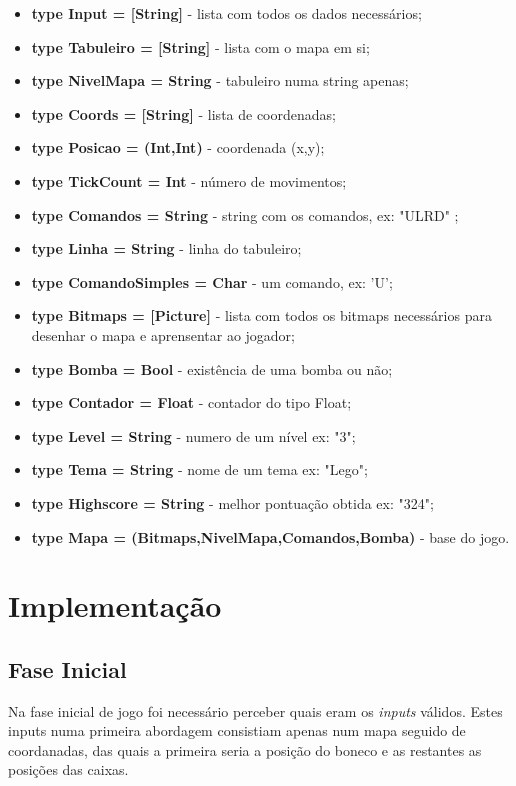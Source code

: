 \documentclass[12pt,a4paper]{report}
\begin{document}
\begin{itemize}
  \item \textbf{type Input          = [String]}   - lista com todos os dados necessários;    
  \item \textbf{type Tabuleiro      = [String]}   - lista com o mapa em si;
  \item \textbf{type NivelMapa      = String}     - tabuleiro numa string apenas;
  \item \textbf{type Coords         = [String]}   - lista de coordenadas;
  \item \textbf{type Posicao        = (Int,Int)}  - coordenada (x,y);
  \item \textbf{type TickCount      = Int}        - número de movimentos;
  \item \textbf{type Comandos       = String}     - string com os comandos, ex: "ULRD" ;
  \item \textbf{type Linha          = String}     - linha do tabuleiro;
  \item \textbf{type ComandoSimples = Char}       - um comando, ex: 'U';
  \item \textbf{type Bitmaps        = [Picture]}  - lista com todos os bitmaps necessários para desenhar o mapa e aprensentar ao jogador;
  \item \textbf{type Bomba          = Bool}       - existência de uma bomba ou não;
  \item \textbf{type Contador       = Float}      - contador do tipo Float;
  \item \textbf{type Level          = String}     - numero de um nível ex: "3";
  \item \textbf{type Tema           = String}     - nome de um tema ex: "Lego";
  \item \textbf{type Highscore      = String}     - melhor pontuação obtida ex: "324";
  \item \textbf{type Mapa = (Bitmaps,NivelMapa,Comandos,Bomba)} - base do jogo.
\end{itemize}


\section{Implementação}
\subsection{Fase Inicial}

 \hfill

Na fase inicial de jogo foi necessário perceber quais eram os \emph{inputs} válidos. Estes inputs numa primeira abordagem consistiam apenas num mapa seguido de coordanadas, das quais a primeira seria a posição do boneco e as restantes as posições das caixas.
\end{document}
